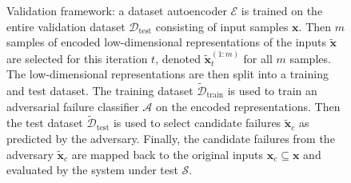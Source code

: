\begin{figure}[t]
\centering
{}
\caption{Validation framework: a dataset autoencoder $\mathcal{E}$ is trained on the entire validation dataset $\mathcal{D}_\text{test}$ consisting of input samples $\mathbf{x}$. Then $m$ samples of encoded low-dimensional representations of the inputs $\tilde{\mathbf{x}}$ are selected for this iteration $t$, denoted $\tilde{\mathbf{x}}_t^{(1:m)}$ for all $m$ samples. The low-dimensional representations are then split into a training and test dataset. The training dataset $\tilde{\mathcal{D}}_\text{train}$ is used to train an adversarial failure classifier $\mathcal{A}$ on the encoded representations. Then the test dataset $\tilde{\mathcal{D}}_\text{test}$ is used to select candidate failures $\tilde{\mathbf{x}}_c$ as predicted by the adversary. Finally, the candidate failures from the adversary $\tilde{\mathbf{x}}_c$ are mapped back to the original inputs $\mathbf{x}_c \subseteq \mathbf{x}$ and evaluated by the system under test $\mathcal{S}$.}
\label{fig:framework}
\end{figure}


